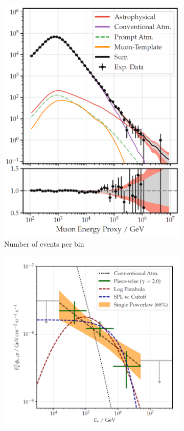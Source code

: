 \documentclass{article}
\begin{document}
\begin{figure}
    \centering
    \begin{subfigure}[b]{0.35\textwidth}
        \centering
        \includegraphics[width=\textwidth]{Ice_cube_flux_tot.png}
        \caption{Number of events per bin}
    \end{subfigure}%
    \begin{subfigure}[b]{0.5\textwidth}
        \centering
        \includegraphics[width=\textwidth]{Ice_cube_flux_astro.png}

\end{subfigure}
\end{figure}
\end{document}
